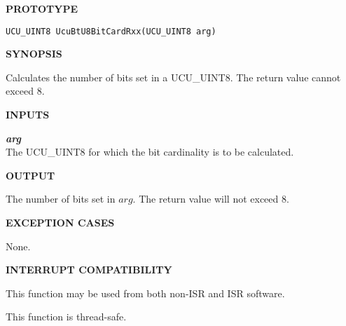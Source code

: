 %

\noindent\textbf{PROTOTYPE}
\begin {list}{}{\setlength{\leftmargin}{0.25in}\setlength{\topsep}{0.0in}}
\item
\begin{verbatim}
UCU_UINT8 UcuBtU8BitCardRxx(UCU_UINT8 arg)
\end{verbatim}
\end{list}
\vspace{2.8ex}

\noindent\textbf{SYNOPSIS}
\begin{list}{}{\setlength{\leftmargin}{0.25in}\setlength{\topsep}{0.0in}}
\item Calculates the number of bits set in a UCU\_UINT8.  The return value cannot
      exceed 8.
\end{list}
\vspace{2.8ex}

\noindent\textbf{INPUTS}
\begin{list}{}{\setlength{\leftmargin}{0.5in}\setlength{\itemindent}{-0.25in}\setlength{\topsep}{0.0in}\setlength{\partopsep}{0.0in}}
\item \emph{\textbf{arg}}\\
      The UCU\_UINT8 for which the bit cardinality is to be calculated.
\end{list}
\vspace{2.8ex}

\noindent\textbf{OUTPUT}
\begin{list}{}{\setlength{\leftmargin}{0.25in}\setlength{\topsep}{0.0in}}
\item  The number of bits set in $arg$.  The return value will not exceed 8.
\end{list}
\vspace{2.8ex}

\noindent\textbf{EXCEPTION CASES}
\begin{list}{}{\setlength{\leftmargin}{0.25in}\setlength{\topsep}{0.0in}}
\item None.
\end{list}
\vspace{2.8ex}

\noindent\textbf{INTERRUPT COMPATIBILITY}
\begin{list}{}{\setlength{\leftmargin}{0.25in}\setlength{\topsep}{0.0in}}
\item This function may be used from both non-ISR and ISR software.
\item This function is thread-safe.
\end{list}
\vspace{2.8ex}

